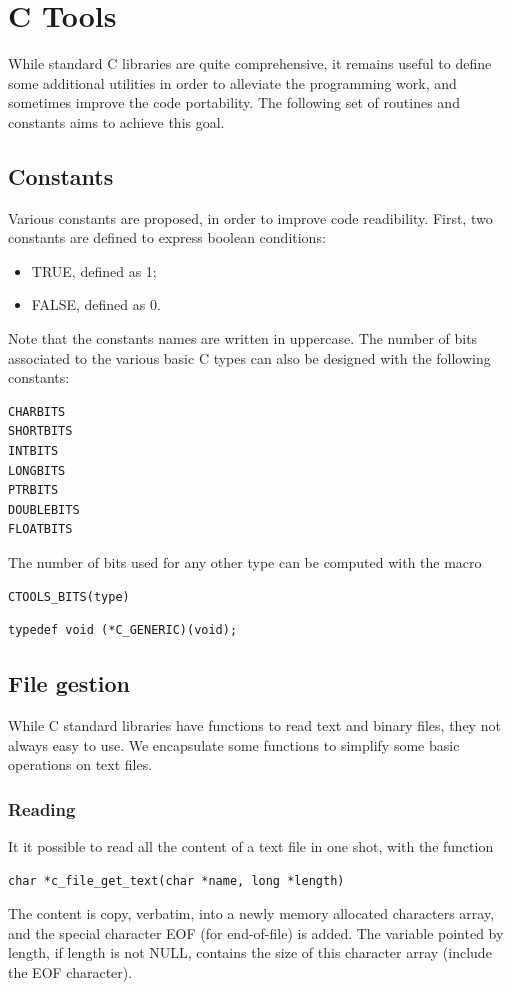 \chapter{C Tools}

While standard C libraries are quite comprehensive, it remains useful
to define some additional utilities in order to alleviate the
programming work, and sometimes improve the code portability.
The following set of routines and constants aims to achieve this goal.

\section{Constants}

Various constants are proposed, in order to improve code readibility.
First, two constants are defined to express boolean conditions:
\begin{itemize}
\item
{\sf TRUE}, defined as 1;
\item
{\sf FALSE}, defined as 0.
\end{itemize}
Note that the constants names are written in uppercase.
The number of bits associated to the various basic C types can also be
designed with the following constants:
\begin{verbatim}
CHARBITS
SHORTBITS
INTBITS
LONGBITS
PTRBITS
DOUBLEBITS
FLOATBITS
\end{verbatim}
The number of bits used for any other type can be computed with the
macro
\begin{verbatim}
CTOOLS_BITS(type)
\end{verbatim}

\begin{verbatim}
typedef void (*C_GENERIC)(void);
\end{verbatim}

\section{File gestion}

While C standard libraries have functions to read text and binary files, they
not always easy to use.
We encapsulate some functions to simplify some basic operations on text files.

\subsection{Reading}

It it possible to read all the content of a text file in one shot, with the
function
\begin{verbatim}
char *c_file_get_text(char *name, long *length)
\end{verbatim}
The content is copy, verbatim, into a newly memory allocated characters array,
and the special character EOF (for end-of-file) is added.
The variable pointed by length, if length is not NULL, contains the size of this
character array (include the EOF character).

